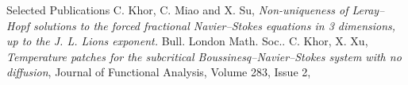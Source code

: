 
\begin{rubric}{Selected Publications}
  \entry*[2023\myhori{} ]C. Khor, C. Miao and X. Su, \emph{Non-uniqueness of Leray--Hopf solutions to the forced fractional Navier--Stokes equations in 3 dimensions, up to the J. L. Lions exponent.} Bull. London Math. Soc.. 
  \entry*[2022\myhori{} ]C. Khor, X. Xu,
  \emph{Temperature patches for the subcritical Boussinesq--Navier--Stokes system with no diffusion},
Journal of Functional Analysis,
Volume 283, Issue 2,
\end{rubric}
  
